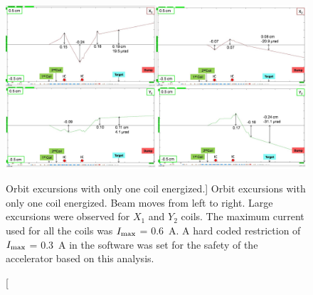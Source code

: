 \begin{singlespace}
\begin{figure}[!h]
	\begin{center}
	\includegraphics[width=15.0cm]{figures/BModMachineProtectionAllSingle}
	\end{center}
	\caption
	[Orbit excursions with only one coil energized.]
	{Orbit excursions with only one coil energized. Beam moves from left to right. Large excursions were observed for $X_{1}$ and $Y_{2}$ coils. The maximum current used for all the coils was $I_{\rm max}$ = 0.6~A. A hard coded restriction of $I_{\rm max}$ = 0.3~A in the software was set for the safety of the accelerator based on this analysis.
	}
	\label{fig:BModMachineProtectionAllSingle}
\end{figure}
\end{singlespace}



